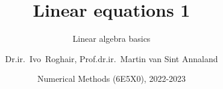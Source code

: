 \documentclass[10pt,table,final,fleqn,xcolor={usenames,dvipsnames},aspectratio=169]{beamer}
\author[I.~Roghair]{Dr.ir.~Ivo~Roghair, Prof.dr.ir.~Martin van Sint Annaland}
\institute{Chemical Process Intensification group\\Eindhoven University of Technology}
\date{\small Numerical Methods (6E5X0), 2022-2023}
\begin{document}
% 

% 

% 

% 

% 

% 

\title{Linear equations 1}
\subtitle{Linear algebra basics}


% 

% 


% 

% 

% 

% 
\end{document}
